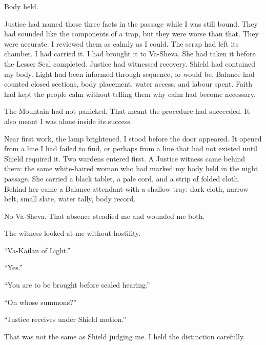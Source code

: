 Body held.\par

Justice had named those three facts in the passage while I was still bound. They had sounded like the components of a trap, but they were worse than that. They were accurate. I reviewed them as calmly as I could. The scrap had left its chamber. I had carried it. I had brought it to Va-Sheva. She had taken it before the Lesser Seal completed. Justice had witnessed recovery. Shield had contained my body. Light had been informed through sequence, or would be. Balance had counted closed sections, body placement, water access, and labour spent. Faith had kept the people calm without telling them why calm had become necessary.\par

The Mountain had not panicked. That meant the procedure had succeeded. It also meant I was alone inside its success.\par

Near first work, the lamp brightened. I stood before the door appeared. It opened from a line I had failed to find, or perhaps from a line that had not existed until Shield required it. Two wardens entered first. A Justice witness came behind them: the same white-haired woman who had marked my body held in the night passage. She carried a black tablet, a pale cord, and a strip of folded cloth. Behind her came a Balance attendant with a shallow tray: dark cloth, narrow belt, small slate, water tally, body record.\par

No Va-Sheva. That absence steadied me and wounded me both.\par

The witness looked at me without hostility.\par

``Va-Kailan of Light.''\par

``Yes.''\par

``You are to be brought before sealed hearing.''\par

``On whose summons?''\par

``Justice receives under Shield motion.''\par

That was not the same as Shield judging me. I held the distinction carefully.\par

